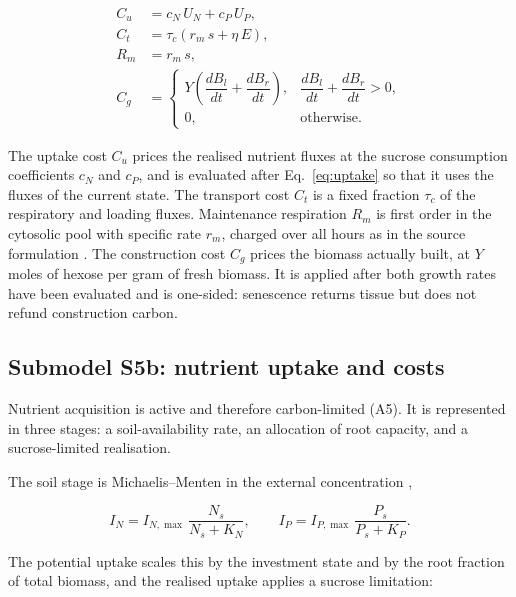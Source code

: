 \begin{align}
C_u &= c_N\,U_N + c_P\,U_P ,
\label{eq:uptake_cost}\\[3pt]
C_t &= \tau_c\left(r_m\,s + \eta\,E\right),
\label{eq:transport_cost}\\[3pt]
R_m &= r_m\,s ,
\label{eq:respiration}\\[3pt]
C_g &=
\begin{cases}
Y\left(\dfrac{dB_l}{dt} + \dfrac{dB_r}{dt}\right), &
\dfrac{dB_l}{dt} + \dfrac{dB_r}{dt} > 0, \\[10pt]
0, & \text{otherwise} .
\end{cases}
\label{eq:growth_cost}
\end{align}

The uptake cost $C_u$ prices the realised nutrient fluxes at the sucrose
consumption coefficients $c_N$ and $c_P$, and is evaluated after
Eq.~\eqref{eq:uptake} so that it uses the fluxes of the current state. The
transport cost $C_t$ is a fixed fraction $\tau_c$ of the respiratory and loading
fluxes. Maintenance respiration $R_m$ is first order in the cytosolic pool with
specific rate $r_m$, charged over all hours as in the source formulation
\citep{Tedone2020}. The construction cost $C_g$ prices the biomass actually
built, at $Y$ moles of hexose per gram of fresh biomass. It is applied after both
growth rates have been evaluated and is one-sided: senescence returns tissue but
does not refund construction carbon.

\subsection{Submodel S5b: nutrient uptake and costs}
\label{sec:nutrients}

Nutrient acquisition is active and therefore carbon-limited (A5). It is
represented in three stages: a soil-availability rate, an allocation of root
capacity, and a sucrose-limited realisation.

The soil stage is Michaelis--Menten in the external concentration
\citep{Epstein1952,Tinker2000},

\begin{equation}
I_N = I_{N,\max}\,\frac{N_s}{N_s + K_N},
\qquad
I_P = I_{P,\max}\,\frac{P_s}{P_s + K_P} .
\label{eq:soil_uptake}
\end{equation}

The potential uptake scales this by the investment state and by the root
fraction of total biomass, and the realised uptake applies a sucrose limitation:

